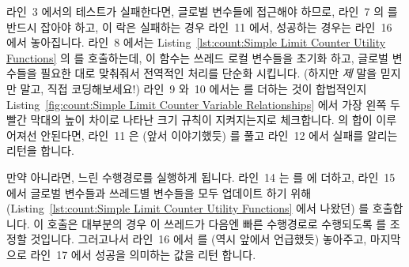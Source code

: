 라인~3 에서의 테스트가 실패한다면, 글로벌 변수들에 접근해야 하므로, 라인~7 의
 를 반드시 잡아야 하고, 이 락은 실패하는 경우 라인~11 에서,
성공하는 경우는 라인~16 에서 놓아집니다.
라인~8 에서는 Listing~\ref{lst:count:Simple Limit Counter Utility Functions} 의
 를 호출하는데, 이 함수는 쓰레드 로컬 변수들을 초기화
하고, 글로벌 변수들을 필요한 대로 맞춰줘서 전역적인 처리를 단순화 시킵니다.
(하지만 \emph{제} 말을 믿지만 말고, 직접 코딩해보세요!)
라인~9 와~10 에서는  를 더하는 것이 합법적인지
Listing~\ref{fig:count:Simple Limit Counter Variable Relationships} 에서 가장
왼쪽 두 빨간 막대의 높이 차이로 나타난 크기 규칙이 지켜지는지로 체크합니다.
 의 합이 이루어져선 안된다면, 라인~11 은 (앞서 이야기했듯)
 를 풀고 라인~12 에서 실패를 알리는 리턴을 합니다.

만약 아니라면, 느린 수행경로를 실행하게 됩니다.
라인~14 는  를  에 더하고, 라인~15 에서 글로벌
변수들과 쓰레드별 변수들을 모두 업데이트 하기 위해
(Listing~\ref{lst:count:Simple Limit Counter Utility Functions} 에서 나왔던)
 를 호출합니다.
이  호출은 대부분의 경우 이 쓰레드가 다음엔 빠른 수행경로로
수행되도록  를 조정할 것입니다.
그러고나서 라인~16 에서  를 (역시 앞에서 언급했듯) 놓아주고,
마지막으로 라인~17 에서 성공을 의미하는 값을 리턴 합니다.


